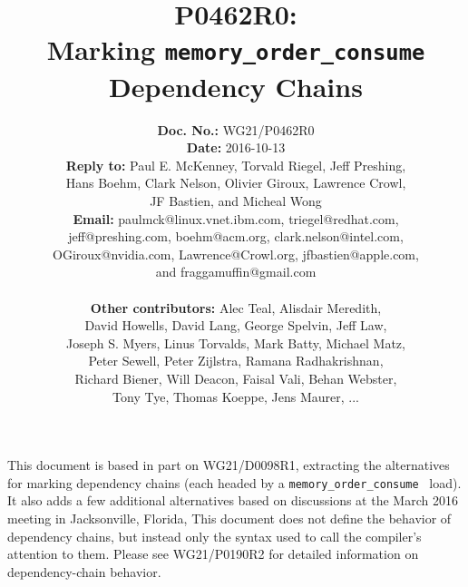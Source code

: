 \documentclass[letterpaper,10pt]{article}
\begin{document}
\newcommand{\co}[1]{\lstinline[breaklines=yes,breakatwhitespace=yes]{#1}}

\title{P0462R0:\\ Marking {\tt memory\_order\_consume} Dependency Chains}

\author{
{\bf Doc. No.: } WG21/P0462R0 \\
{\bf Date: } 2016-10-13 \\
{\bf Reply to: } Paul E. McKenney, Torvald Riegel, Jeff Preshing, \\
	Hans Boehm, Clark Nelson, Olivier Giroux, Lawrence Crowl, \\
	JF Bastien, and Micheal Wong \\
{\bf Email: } paulmck@linux.vnet.ibm.com, triegel@redhat.com, \\
jeff@preshing.com, boehm@acm.org, clark.nelson@intel.com, \\
OGiroux@nvidia.com, Lawrence@Crowl.org, jfbastien@apple.com, \\
and fraggamuffin@gmail.com \\ ~ \\
{\bf Other contributors: }
	Alec Teal,
	Alisdair Meredith, \\
	David Howells,
	David Lang,
	George Spelvin,
	Jeff Law, \\
	Joseph S. Myers,
	Linus Torvalds,
	Mark Batty,
	Michael Matz, \\
	Peter Sewell,
	Peter Zijlstra,
	Ramana Radhakrishnan, \\
	Richard Biener,
	Will Deacon,
	Faisal Vali,
	Behan Webster, \\
	Tony Tye,
	Thomas Koeppe,
	Jens Maurer,
	... \\
} %


\pagestyle{myheadings}

\maketitle


This document is based in part on WG21/D0098R1, extracting the
alternatives for marking dependency chains (each headed by a
\co{memory_order_consume}~\cite{RichardSmith2015N4527} load).
It also adds a few additional alternatives based on discussions
at the March 2016 meeting in Jacksonville, Florida,
This document does not define the behavior of dependency chains, but instead
only the syntax used to call the compiler's attention to them.
Please see WG21/P0190R2 for detailed information on dependency-chain behavior.
\end{document}
